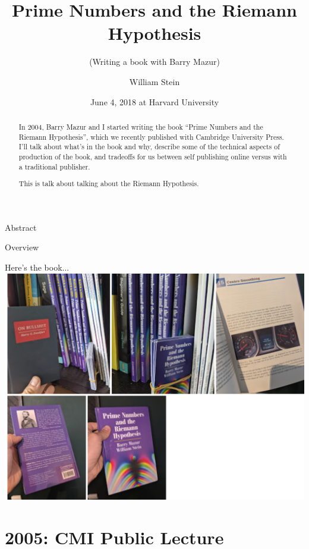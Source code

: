 \documentclass[draft]{beamer}
\title[Prime Numbers]{Prime Numbers and the Riemann Hypothesis}
\subtitle{(Writing a book with Barry Mazur)}
\author[W.\thinspace{}Stein]{William Stein}
\date[Mazur 80]{June 4, 2018 at Harvard University}
\institute[SageMath, Inc. \& UW]{SageMath, Inc. and University of Washington}
\begin{document}
\begin{frame}
  \titlepage
\end{frame}

\begin{frame}{Abstract}
  \begin{abstract}
    In 2004, Barry Mazur and I started writing the
    book ``Prime Numbers and the Riemann Hypothesis'', which we recently
    published with Cambridge University Press. I'll talk about
    what's in the book and why, describe some of the technical aspects
    of production of the book, and tradeoffs for us between
    self publishing online versus with a traditional publisher.

    \vspace{.3in}
    This is talk about talking about the Riemann Hypothesis.
  \end{abstract}
\end{frame}

\begin{frame}{Overview}
  \tableofcontents
\end{frame}

\begin{frame}{Here's the book...}
  \includegraphics[width=.98\textwidth]{pics/the-book.png}
\end{frame}

\section{2005: CMI Public Lecture}
\end{document}
